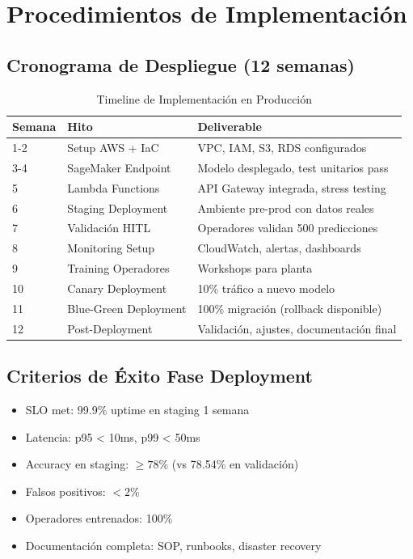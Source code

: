 \documentclass[11pt,letterpaper]{article}
\begin{document}
\section{Procedimientos de Implementación}

\subsection{Cronograma de Despliegue (12 semanas)}

\begin{table}[H]
\centering
\caption{Timeline de Implementación en Producción}
\begin{tabular}{|l|p{3cm}|l|}
\hline
\textbf{Semana} & \textbf{Hito} & \textbf{Deliverable} \\
\hline
1-2 & Setup AWS + IaC & VPC, IAM, S3, RDS configurados \\
\hline
3-4 & SageMaker Endpoint & Modelo desplegado, test unitarios pass \\
\hline
5 & Lambda Functions & API Gateway integrada, stress testing \\
\hline
6 & Staging Deployment & Ambiente pre-prod con datos reales \\
\hline
7 & Validación HITL & Operadores validan 500 predicciones \\
\hline
8 & Monitoring Setup & CloudWatch, alertas, dashboards \\
\hline
9 & Training Operadores & Workshops para planta \\
\hline
10 & Canary Deployment & 10\% tráfico a nuevo modelo \\
\hline
11 & Blue-Green Deployment & 100\% migración (rollback disponible) \\
\hline
12 & Post-Deployment & Validación, ajustes, documentación final \\
\hline
\end{tabular}
\end{table}

\subsection{Criterios de Éxito Fase Deployment}

\begin{itemize}
  \item SLO met: 99.9\% uptime en staging 1 semana
  \item Latencia: p95 < 10ms, p99 < 50ms
  \item Accuracy en staging: $\geq 78\%$ (vs 78.54\% en validación)
  \item Falsos positivos: $< 2\%$
  \item Operadores entrenados: 100\%
  \item Documentación completa: SOP, runbooks, disaster recovery
\end{itemize}
\end{document}
